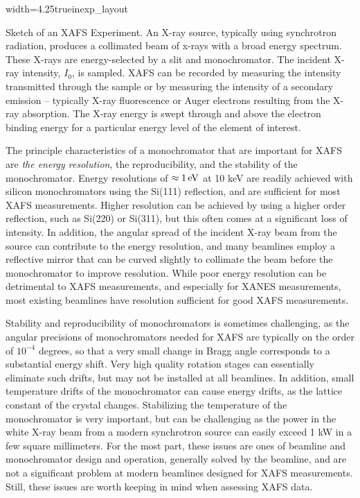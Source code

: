 \begin{Nfig}{width=4.25truein}{exp_layout}
  \caption{Sketch of an XAFS Experiment.  An X-ray source, typically using
    synchrotron radiation, produces a collimated beam of x-rays with a
    broad energy spectrum.  These X-rays are energy-selected by a slit and
    monochromator.  The incident X-ray intensity, $I_0$, is sampled.  XAFS
    can be recorded by measuring the intensity transmitted through the
    sample or by measuring the intensity of a secondary emission --
    typically X-ray fluorescence or Auger electrons resulting from the
    X-ray absorption.  The X-ray energy is swept through and above the
    electron binding energy for a particular energy level of the element of
    interest.}
  \label{Fig:EXPT:cartoon}
\end{Nfig}


The principle characteristics of a monochromator that are important for
XAFS are {\emph{the energy resolution}}, the reproducibility, and the
stability of the monochromator. Energy resolutions of $\approx 1\rm\, eV$
at 10 keV are readily achieved with silicon monochromators using the
Si(111) reflection, and are sufficient for most XAFS measurements.  Higher
resolution can be achieved by using a higher order reflection, such as
Si(220) or Si(311), but this often comes at a significant loss of
intensity.  In addition, the angular spread of the incident X-ray beam from
the source can contribute to the energy resolution, and many beamlines
employ a reflective mirror that can be curved slightly to collimate the
beam before the monochromator to improve resolution.  While poor energy
resolution can be detrimental to XAFS measurements, and especially for
XANES measurements, most existing beamlines have resolution sufficient for
good XAFS measurements.

Stability and reproducibility of monochromators is sometimes challenging,
as the angular precisions of monochromators needed for XAFS are typically
on the order of $10^{-4}$ degrees, so that a very small change in Bragg
angle corresponds to a substantial energy shift.  Very high quality
rotation stages can essentially eliminate such drifts, but may not be
installed at all beamlines.  In addition, small temperature drifts of the
monochromator can cause energy drifts, as the lattice constant of the
crystal changes.  Stabilizing the temperature of the monochromator is very
important, but can be challenging as the power in the white X-ray beam from
a modern synchrotron source can easily exceed 1 kW in a few square
millimeters.  For the most part, these issues are ones of beamline and
monochromator design and operation, generally solved by the beamline, and
are not a significant problem at modern beamlines designed for XAFS
measurements.  Still, these issues are worth keeping in mind when assessing
XAFS data.


